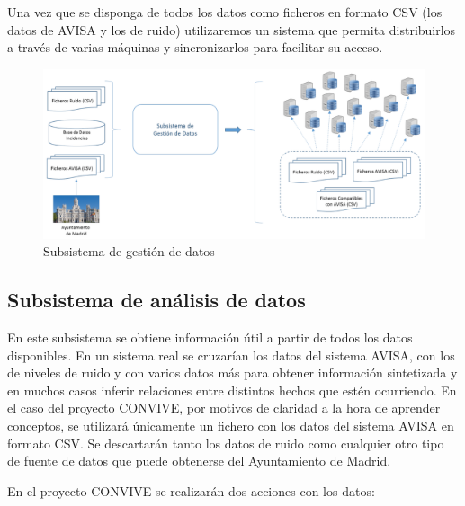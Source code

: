 \documentclass[
  a4paper,
]{scrreport}
\begin{document}
Una vez que se disponga de todos los datos como ficheros en formato CSV
(los datos de AVISA y los de ruido) utilizaremos un sistema que permita
distribuirlos a través de varias máquinas y sincronizarlos para
facilitar su acceso.

\begin{figure}

{\centering \includegraphics{./img/convive/subsistema-gestion-datos.png}

}

\caption{Subsistema de gestión de datos}

\end{figure}

\hypertarget{subsistema-de-anuxe1lisis-de-datos}{%
\subsection{Subsistema de análisis de
datos}\label{subsistema-de-anuxe1lisis-de-datos}}

En este subsistema se obtiene información útil a partir de todos los
datos disponibles. En un sistema real se cruzarían los datos del sistema
AVISA, con los de niveles de ruido y con varios datos más para obtener
información sintetizada y en muchos casos inferir relaciones entre
distintos hechos que estén ocurriendo. En el caso del proyecto CONVIVE,
por motivos de claridad a la hora de aprender conceptos, se utilizará
únicamente un fichero con los datos del sistema AVISA en formato CSV. Se
descartarán tanto los datos de ruido como cualquier otro tipo de fuente
de datos que puede obtenerse del Ayuntamiento de Madrid.

En el proyecto CONVIVE se realizarán dos acciones con los datos:
\end{document}

